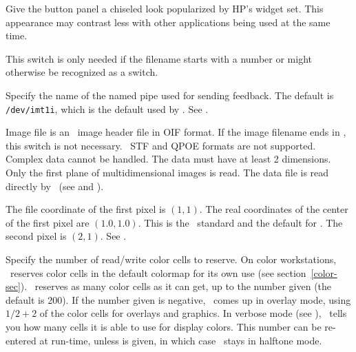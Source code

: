 \begin{description}

Give the button panel a chiseled look popularized by HP's widget
set.  This appearance may contrast less with other applications
being used at the same time.


This switch is only needed if the filename starts with a number
or might otherwise be recognized as a switch.


Specify the name of the named pipe used for sending feedback.
The default is \verb"/dev/imt1i", which is the default used by \IRAF.
See .


Image file is an \IRAF\ image header file in OIF format.  If the
image filename ends in , this switch is not necessary.
\IRAF\ STF and QPOE formats are not supported.  Complex data cannot be
handled.  The data must have at least 2 dimensions.  Only the first
plane of multidimensional images is read.  The data file is read
directly by \SAO\ (see  and ).


The file coordinate of the first pixel is $(1,1)$.  The real coordinates
of the center of the first pixel are $(1.0,1.0)$.  This is
the \IRAF\ standard and the default for \SAO.
The second pixel is $(2,1)$.  See .


Specify the number of read/write color cells to reserve.  On
color workstations, \SAO\ reserves color cells in the default
colormap for its own use (see section~\ref{color-sec}).  \SAO\ reserves
as many color cells as it can get, up to the number
given (the default is 200).  If the number given is negative,
\SAO\ comes up in overlay mode, using $1/2 + 2$ of the color
cells for overlays and graphics.  In verbose mode (see ),
\SAO\ tells you how many cells it is able to use for display
colors.  This number can be re-entered at run-time, unless
\hbox{} is given,
in which case \SAO\ stays in halftone mode.



\end{description}
